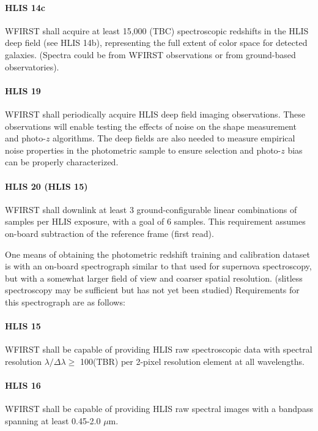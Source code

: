 \paragraph{HLIS 14c} WFIRST shall acquire at least 15,000 (TBC) spectroscopic redshifts in
the HLIS deep field (see HLIS 14b), representing the full extent of color space
for detected galaxies. (Spectra could be from WFIRST observations or from
ground-based observatories).

\paragraph{HLIS 19} WFIRST shall periodically acquire HLIS deep field imaging observations.
These observations will enable testing the effects of noise on the shape
measurement and photo-$z$ algorithms. The deep fields are also needed to measure
empirical noise properties in the photometric sample to ensure selection and
photo-$z$ bias can be properly characterized.

\paragraph{HLIS 20 (HLIS 15)} WFIRST shall downlink at least 3 ground-configurable linear
combinations of samples per HLIS exposure, with a goal of 6 samples. This
requirement assumes on-board subtraction of the reference frame (first read).

One means of obtaining the photometric redshift training and calibration dataset
is with an on-board spectrograph similar to that used for supernova
spectroscopy, but with a somewhat larger field of view and coarser spatial
resolution. (slitless spectroscopy may be sufficient but has not yet been
studied) Requirements for this spectrograph are as follows:

\paragraph{HLIS 15} WFIRST shall be capable of providing HLIS raw spectroscopic data with spectral
resolution $\lambda /\Delta \lambda \geq$ 100(TBR) per 2-pixel resolution element at all wavelengths.

\paragraph{HLIS 16} WFIRST shall be capable of providing HLIS raw spectral images with a
bandpass spanning at least 0.45-2.0 $\mu$m.

